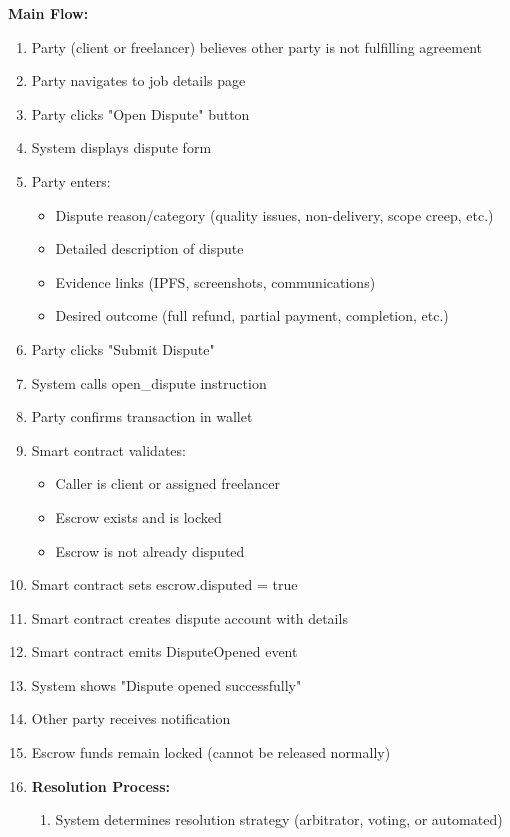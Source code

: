 \documentclass[a4paper,13pt,twoside]{report}
\theoremstyle{definition}
\begin{document}
\textbf{Main Flow:}
\begin{enumerate}
    \item Party (client or freelancer) believes other party is not fulfilling agreement
    \item Party navigates to job details page
    \item Party clicks "Open Dispute" button
    \item System displays dispute form
    \item Party enters:
    \begin{itemize}
        \item Dispute reason/category (quality issues, non-delivery, scope creep, etc.)
        \item Detailed description of dispute
        \item Evidence links (IPFS, screenshots, communications)
        \item Desired outcome (full refund, partial payment, completion, etc.)
    \end{itemize}
    \item Party clicks "Submit Dispute"
    \item System calls open\_dispute instruction
    \item Party confirms transaction in wallet
    \item Smart contract validates:
    \begin{itemize}
        \item Caller is client or assigned freelancer
        \item Escrow exists and is locked
        \item Escrow is not already disputed
    \end{itemize}
    \item Smart contract sets escrow.disputed = true
    \item Smart contract creates dispute account with details
    \item Smart contract emits DisputeOpened event
    \item System shows "Dispute opened successfully"
    \item Other party receives notification
    \item Escrow funds remain locked (cannot be released normally)
    \item \textbf{Resolution Process:}
    \begin{enumerate}
        \item System determines resolution strategy (arbitrator, voting, or automated)

\end{enumerate}
\end{enumerate}
\end{document}
